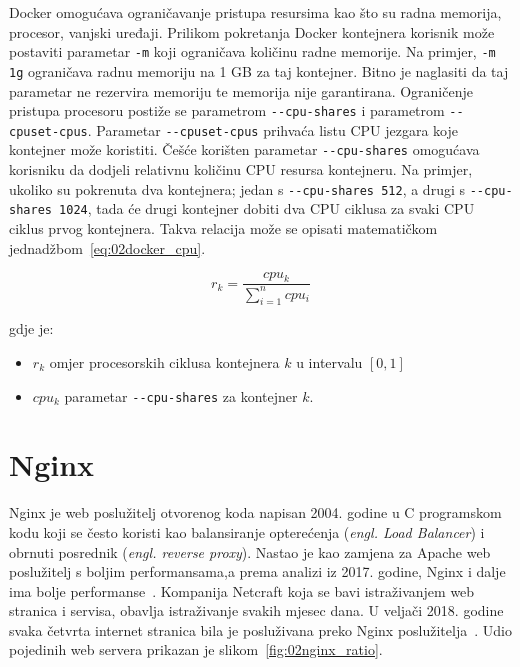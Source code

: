Docker omogućava ograničavanje pristupa resursima kao što su radna memorija, procesor, vanjski
uređaji. Prilikom pokretanja Docker kontejnera korisnik može postaviti parametar \texttt{-m} koji
ograničava količinu radne memorije. Na primjer, \texttt{-m 1g} ograničava radnu memoriju na 1 GB za
taj kontejner. Bitno je naglasiti da taj parametar ne rezervira memoriju te memorija nije
garantirana.  Ograničenje pristupa procesoru postiže se parametrom \texttt{-{}-cpu-shares} i
parametrom \texttt{-{}-cpuset-cpus}.  Parametar \texttt{-{}-cpuset-cpus} prihvaća listu CPU jezgara
koje kontejner može koristiti. Češće korišten parametar \texttt{-{}-cpu-shares} omogućava korisniku
da dodjeli relativnu količinu CPU resursa kontejneru.  Na primjer, ukoliko su pokrenuta dva
kontejnera; jedan s \texttt{-{}-cpu-shares 512}, a drugi s \texttt{-{}-cpu-shares 1024}, tada će
drugi kontejner dobiti dva CPU ciklusa za svaki CPU ciklus prvog kontejnera. Takva relacija može se
opisati matematičkom jednadžbom~\ref{eq:02docker_cpu}.

\begin{equation}
   r_k = \frac{cpu_k} {\sum_{i=1}^{n} cpu_i}
   \label{eq:02docker_cpu}
\end{equation}

gdje je:

\begin{itemize}
    \item $r_k$ omjer procesorskih ciklusa kontejnera $k$ u intervalu $[0, 1]$
    \item $cpu_k$ parametar \texttt{-{}-cpu-shares} za kontejner $k$.
\end{itemize}

\section{Nginx}
Nginx je web poslužitelj otvorenog koda napisan 2004. godine u C programskom kodu koji se često
koristi kao balansiranje opterećenja (\textit{engl. Load Balancer}) i obrnuti posrednik
(\textit{engl. reverse proxy}). Nastao je kao zamjena za Apache web poslužitelj s boljim
performansama,a prema analizi iz 2017. godine, Nginx i dalje ima bolje
performanse~\citep{nguyen2017comparative}. Kompanija Netcraft koja se bavi istraživanjem web
stranica i servisa, obavlja istraživanje svakih mjesec dana. U veljači 2018. godine svaka četvrta
internet stranica bila je posluživana preko Nginx poslužitelja~\citep{Netcraft2018}. Udio pojedinih
web servera prikazan je slikom~\ref{fig:02nginx_ratio}.

